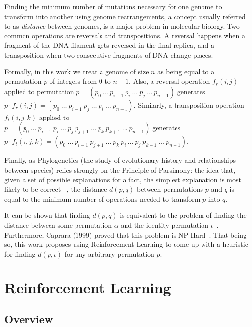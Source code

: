 \documentclass[11pt,twoside]{article}
\begin{document}
Finding the minimum number of mutations necessary for one genome to transform into another using genome rearrangements, a concept usually referred to as \textit{distance} between genomes, is a major problem in molecular biology. Two common operations are reversals and transpositions. A reversal happens when a fragment of the DNA filament gets reversed in the final replica, and a transposition when two consecutive fragments of DNA change places. 

Formally, in this work we treat a genome of size $n$ as being equal to a permutation $p$ of integers from $0$ to $n - 1$. Also, a reversal operation $f_r(i,j)$ applied to permutation $p = (p_0\ \ldots\ p_{i-1}\ p_{i}\ \ldots\ p_{j}\ \ldots\ p_{n-1})$ generates $p \cdot f_r(i,j) = (p_0\ \ldots\ p_{i-1}\ p_{j}\ \ldots\ p_{i}\ \ldots\ p_{n-1})$. Similarly, a transposition operation $f_t(i,j,k)$ applied to\\ $p = (p_0\ \ldots\ p_{i-1}\ p_{i}\ \ldots\ p_{j}\ p_{j+1}\ \ldots\ p_{k}\ p_{k+1}\ \ldots\ p_{n-1})$ generates\\ $p \cdot f_t(i,j,k) = (p_0\ \ldots\ p_{i-1}\ p_{j+1}\ \ldots\ p_{k}\ p_{i}\ \ldots\ p_{j}\ p_{k+1}\ \ldots\ p_{n-1})$.

Finally, as Phylogenetics (the study of evolutionary history and relationships between species) relies strongly on the Principle of Parsimony: the idea that, given a set of possible explanations for a fact, the simplest explanation is most likely to be correct ~\cite{parsimony}, the distance $d(p, q)$ between permutations $p$ and $q$ is equal to the minimum number of operations needed to transform $p$ into $q$. 

It can be shown that finding $d(p, q)$ is equivalent to the problem of finding the distance between some permutation $\alpha$ and the identity permutation $\iota$~\cite{flavio}. Furthermore, Caprara (1999) proved that this problem is NP-Hard~\cite{caprara1999sorting}. That being so, this work proposes using Reinforcement Learning to come up with a heuristic for finding $d(p, \iota)$ for any arbitrary permutation $p$.

\section{Reinforcement Learning}

\subsection{Overview}
\end{document}
